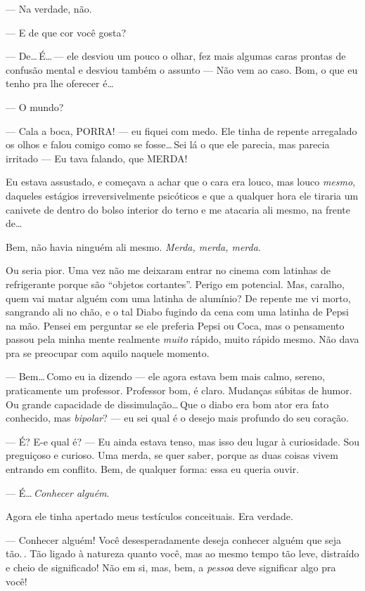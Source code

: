 --- Na verdade, não.

--- E de que cor você gosta?

--- De\ldots\,É\ldots\,--- ele desviou um pouco o olhar, fez mais algumas caras prontas de confusão mental e desviou também o assunto --- Não vem ao caso. Bom, o que eu tenho pra lhe oferecer é\ldots

--- O mundo?

--- Cala a boca, PORRA! --- eu fiquei com medo. Ele tinha de repente arregalado os olhos e falou comigo como se fosse\ldots\,Sei lá o que ele parecia, mas parecia irritado --- Eu tava falando, que MERDA!

Eu estava assustado, e começava a achar que o cara era louco, mas louco \emph{mesmo}, daqueles estágios irreversivelmente psicóticos e que a qualquer hora ele tiraria um canivete de dentro do bolso interior do terno e me atacaria ali mesmo, na frente de\ldots

Bem, não havia ninguém ali mesmo. \emph{Merda, merda, merda}.

Ou seria pior. Uma vez não me deixaram entrar no cinema com latinhas de refrigerante porque são ``objetos cortantes''. Perigo em potencial. Mas, caralho, quem vai matar alguém com uma latinha de alumínio? De repente me vi morto, sangrando ali no chão, e o tal Diabo fugindo da cena com uma latinha de Pepsi na mão. Pensei em perguntar se ele preferia Pepsi ou Coca, mas o pensamento passou pela minha mente realmente \emph{muito} rápido, muito rápido mesmo. Não dava pra se preocupar com aquilo naquele momento.

--- Bem\ldots\,Como eu ia dizendo --- ele agora estava bem mais calmo, sereno, praticamente um professor. Professor bom, é claro. Mudanças súbitas de humor. Ou grande capacidade de dissimulação\ldots\,Que o diabo era bom ator era fato conhecido, mas \emph{bipolar}? --- eu sei qual é o desejo mais profundo do seu coração.

--- É? E-e qual é? --- Eu ainda estava tenso, mas isso deu lugar à curiosidade. Sou preguiçoso e curioso. Uma merda, se quer saber, porque as duas coisas vivem entrando em conflito. Bem, de qualquer forma: essa eu queria ouvir.

--- É\ldots\,\emph{Conhecer alguém}.

Agora ele tinha apertado meus testículos conceituais. Era verdade.

--- Conhecer alguém! Você desesperadamente deseja conhecer alguém que seja tão.\,.\,\,Tão ligado à natureza quanto você, mas ao mesmo tempo tão leve, distraído e cheio de significado! Não em si, mas, bem, a \emph{pessoa} deve significar algo pra você!

